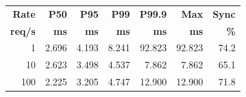 \begin{tabular}{@{}rrrrrrr@{}}
\toprule
\textbf{Rate} & \textbf{P50} & \textbf{P95} & \textbf{P99} & \textbf{P99.9} & \textbf{Max} & \textbf{Sync} \\
\textbf{req/s} & \textbf{ms} & \textbf{ms} & \textbf{ms} & \textbf{ms} & \textbf{ms} & \textbf{\%} \\
\midrule
1 & 2.696 & 4.193 & 8.241 & 92.823 & 92.823 & 74.2 \\
10 & 2.623 & 3.498 & 4.537 & 7.862 & 7.862 & 65.1 \\
100 & 2.225 & 3.205 & 4.747 & 12.900 & 12.900 & 71.8 \\
\bottomrule
\end{tabular}
